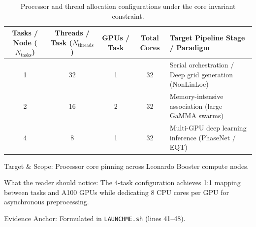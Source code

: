 \begin{table}[htbp]
  \centering
  \small
  \caption{Processor and thread allocation configurations under the core invariant constraint.}
  \label{tab:thread_allocation}
  \begin{threeparttable}
    \begin{tabularx}{\linewidth}{c c c c X}
      \toprule
      \textbf{Tasks / Node} ($N_{\mathrm{tasks}}$) & \textbf{Threads / Task} ($N_{\mathrm{threads}}$) & \textbf{GPUs / Task} & \textbf{Total Cores} & \textbf{Target Pipeline Stage / Paradigm} \\
      \midrule
      1 & 32 & 1 & 32 & Serial orchestration / Deep grid generation (NonLinLoc) \\
      2 & 16 & 2 & 32 & Memory-intensive association (large GaMMA swarms) \\
      4 & 8 & 1 & 32 & Multi-GPU deep learning inference (PhaseNet / EQT) \\
      \bottomrule
    \end{tabularx}
    \begin{tablenotes}[flushleft]
      \footnotesize
      \item Target \& Scope: Processor core pinning across Leonardo Booster compute nodes.
      \item What the reader should notice: The 4-task configuration achieves 1:1 mapping between tasks and A100 GPUs while dedicating 8 CPU cores per GPU for asynchronous preprocessing.
      \item Evidence Anchor: Formulated in \texttt{LAUNCHME.sh} (lines 41--48).
    \end{tablenotes}
  \end{threeparttable}
\end{table}

